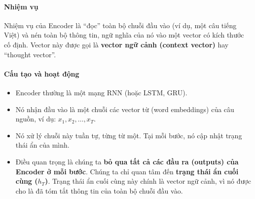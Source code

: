 \paragraph{Nhiệm vụ}
Nhiệm vụ của Encoder là “đọc” toàn bộ chuỗi đầu vào (ví dụ, một câu tiếng Việt) và nén toàn bộ thông tin, ngữ nghĩa của nó vào một vector có kích thước cố định. Vector này được gọi là \textbf{vector ngữ cảnh (context vector)} hay “thought vector”.

\paragraph{Cấu tạo và hoạt động}
\begin{itemize}
    \item Encoder thường là một mạng RNN (hoặc LSTM, GRU).
    \item Nó nhận đầu vào là một chuỗi các vector từ (word embeddings) của câu nguồn, ví dụ: $x_1, x_2, \dots, x_T$.
    \item Nó xử lý chuỗi này tuần tự, từng từ một. Tại mỗi bước, nó cập nhật trạng thái ẩn của mình.
    \item Điều quan trọng là chúng ta \textbf{bỏ qua tất cả các đầu ra (outputs) của Encoder ở mỗi bước}. Chúng ta chỉ quan tâm đến \textbf{trạng thái ẩn cuối cùng ($h_T$)}. Trạng thái ẩn cuối cùng này chính là vector ngữ cảnh, vì nó được cho là đã tóm tắt thông tin của toàn bộ chuỗi đầu vào.
\end{itemize}
